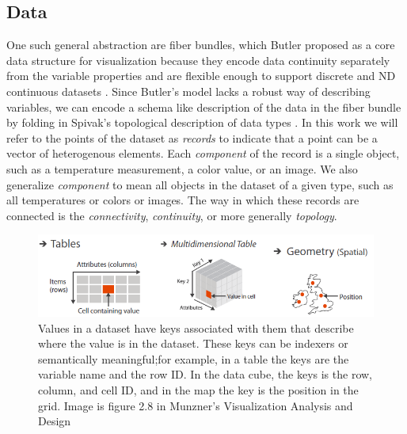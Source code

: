 \documentclass[../main.tex]{subfiles}
\begin{document}
\subsection{Data}
\label{sec:intro_data}
One such general abstraction are fiber bundles, which Butler proposed as a core data structure for visualization because they encode data continuity separately from the variable properties and are flexible enough to support discrete and ND continuous datasets \cite{butlerVisualizationModelBased1989,butlerVectorBundleClassesForm1992}. 
Since Butler's model lacks a robust way of describing variables, we can encode a schema like description of the data in the fiber bundle by folding in Spivak's topological description of data types \cite{spivakDatabasesAreCategories2010,spivakSIMPLICIALDATABASES}. In this work we will refer to the points of the dataset as \textit{records} to indicate that a point can be a vector of heterogenous elements. Each \textit{component} of the record is a single object, such as a temperature measurement, a color value, or an image. We also generalize \textit{component} to mean all objects in the dataset of a given type, such as all temperatures or colors or images. The way in which these records are connected is the \textit{connectivity}, \textit{continuity}, or more generally \textit{topology}.

\begin{figure}[H]
    \includegraphics[width=1\textwidth]{figures/intro/munzner_datatypes.png}
    \caption{Values in a dataset have keys associated with them that describe where the value is in the dataset. These keys can be indexers or semantically meaningful;for example, in a table the keys are the variable name and the row ID. In the data cube,  the keys is the row, column, and cell ID, and in the map the key is the position in the grid. Image is figure 2.8 in Munzner's Visualization Analysis and Design\cite{munznerVisualizationAnalysisDesign2014}}
    \label{fig:intro:keys:values}
\end{figure}
\end{document}
